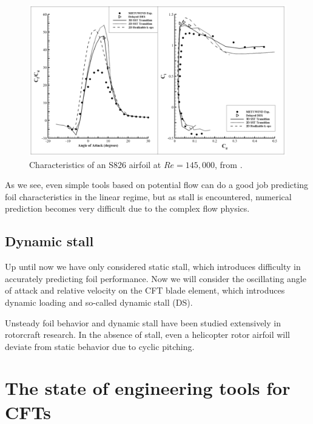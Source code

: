 \begin{figure}[ht]
    \centering
    
    \includegraphics[width=\textwidth]{figures/cakmak-et-al-2014-fig8}
    
    \caption{Characteristics of an S826 airfoil at $Re=145,000$, from
        \cite{Cakmakcioglu2014}.}
    
    \label{fig:S826-perf}
\end{figure}


 As we see, even simple tools based on
potential flow can do a good job predicting foil characteristics in the linear
regime, but as stall is encountered, numerical prediction becomes very difficult
due to the complex flow physics.


\subsection{Dynamic stall}

Up until now we have only considered static stall, which introduces difficulty
in accurately predicting foil performance. Now we will consider the oscillating
angle of attack and relative velocity on the CFT blade element, which introduces
dynamic loading and so-called dynamic stall (DS).

Unsteady foil behavior and dynamic stall have been studied extensively in
rotorcraft research. In the absence of stall, even a helicopter rotor airfoil
will deviate from static behavior due to cyclic pitching.



\section{The state of engineering tools for CFTs}

